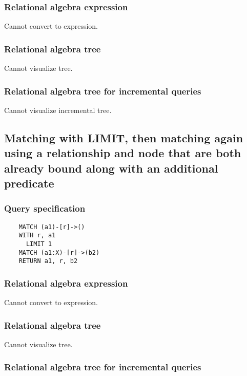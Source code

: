 	\subsubsection*{Relational algebra expression}

	Cannot convert to expression.

	\subsubsection*{Relational algebra tree}

	Cannot visualize tree.

	\subsubsection*{Relational algebra tree for incremental queries}

	Cannot visualize incremental tree.
	\subsection{Matching with LIMIT, then matching again using a relationship and node that are both already bound along with an additional predicate}

	\subsubsection*{Query specification}

	\begin{lstlisting}
	MATCH (a1)-[r]->()
	WITH r, a1
	  LIMIT 1
	MATCH (a1:X)-[r]->(b2)
	RETURN a1, r, b2
	\end{lstlisting}


	\subsubsection*{Relational algebra expression}

	Cannot convert to expression.

	\subsubsection*{Relational algebra tree}

	Cannot visualize tree.

	\subsubsection*{Relational algebra tree for incremental queries}

